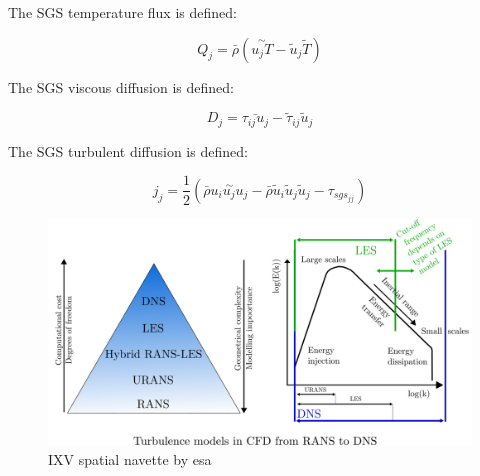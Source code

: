 The SGS temperature flux is defined:

$$Q_j = \bar{\rho}\left(\overset{\sim}{u_j T} -\tilde{u}_j\tilde T\right)$$

The SGS viscous diffusion is defined:

$$D_j = \bar{\tau_{ij}u_j} - \tilde{\tau}_{ij}\tilde{u}_j $$

The SGS turbulent diffusion is defined:

$$j_j = \frac{1}{2}(\bar{\rho}\overset{\sim}{u_i u_j u_j} - \bar{\rho}\tilde{u}_i \tilde{u}_j \tilde{u}_j -\tau_{sgs_{jj}})$$

\begin{figure}[h!]
 \centering
 \includegraphics[width=0.7\linewidth]{chapter1_introduction/pictures/les.png}
 \vspace{-2ex}
 \caption{IXV spatial navette by esa}
  \vspace{2ex}
 \label{les}
\end{figure}
